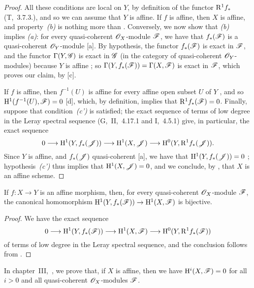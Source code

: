 \begin{proof}
\label{proof-2.5.2.2}
All these conditions are local on $Y$, by definition of the functor $\mathrm{R}^1 f_*$ (T,~3.7.3.), and so we can assume that $Y$ is affine.
If $f$ is affine, then $X$ is affine, and property~\emph{(b)} is nothing more than .
Conversely, we now show that \emph{(b)} implies \emph{(a)}:
for every quasi-coherent $\mathscr{O}_X$-module $\mathscr{F}$, we have that $f_*(\mathscr{F})$ is a quasi-coherent $\mathscr{O}_Y$-module [a].
By hypothesis, the functor $f_*(\mathscr{F})$ is exact in $\mathscr{F}$, and the functor $\Gamma(Y,\mathscr{G})$ is exact in $\mathscr{G}$ (in the category of quasi-coherent $\mathscr{O}_Y$-modules) because $Y$ is affine ;
so $\Gamma(Y,f_*(\mathscr{F}))=\Gamma(X,\mathscr{F})$ is exact in $\mathscr{F}$, which proves our claim, by [c].

If $f$ is affine, then $f^{-1}(U)$ is affine for every affine open subset $U$ of $Y$ , and so $\mathrm{H}^1(f^{-1}(U),\mathscr{F})=0$ [d], which, by definition, implies that $\mathrm{R}^1 f_*(\mathscr{F})=0$.
Finally, suppose that condition~\emph{(c')} is satisfied;
the exact sequence of terms of low degree in the Leray spectral sequence (G,~II,~4.17.1 and I,~4.5.1) give, in particular, the exact sequence
\[
    0\to\HH^1(Y,f_*(\sh{J}))\to\HH^1(X,\sh{J})\to\HH^0(Y,\RR^1 f_*(\sh{J})).
\]
Since $Y$ is affine, and $f_*(\mathscr{J})$ quasi-coherent [a], we have that $\mathrm{H}^1(Y,f_*(\mathscr{J}))=0$ ;
hypothesis~\emph{(c')} thus implies that $\mathrm{H}^1(X,\mathscr{J})=0$, and we conclude, by , that $X$ is an affine scheme.
\end{proof}

\begin{cor}[5.2.3]
\label{2.5.2.3}
If $f:X\to Y$ is an affine morphism, then, for every quasi-coherent $\mathscr{O}_X$-module $\mathscr{F}$, the canonical homomorphism $\HH^1(Y,f_*(\sh{F}))\to\HH^1(X,\sh{F})$ is bijective.
\end{cor}

\begin{proof}
\label{proof-2.5.2.3}
We have the exact sequence
\[
    0\to\HH^1(Y,f_*(\sh{F}))\to\HH^1(X,\sh{F})\to\HH^0(Y,\RR^1 f_*(\sh{F}))
\]
of terms of low degree in the Leray spectral sequence, and the conclusion follows from .
\end{proof}

\begin{rmk}[5.2.4]
\label{2.5.2.4}
In chapter~III,~, we prove that, if $X$ is affine, then we have $\mathrm{H}^i(X,\mathscr{F})=0$ for all $i>0$ and all quasi-coherent $\mathscr{O}_X$-modules $\mathscr{F}$.
\end{rmk}


